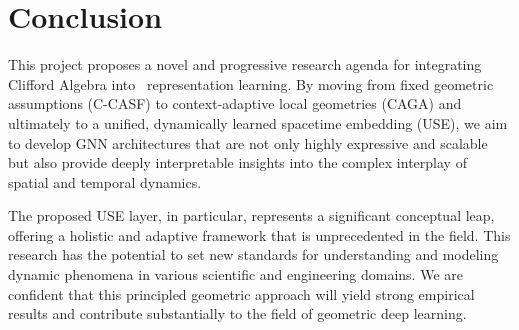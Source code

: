 \documentclass[11pt]{article}
\newcommand{\STG}{\text{CTDSTG}} %
\begin{document}
\section{Conclusion}
This project proposes a novel and progressive research agenda for integrating Clifford Algebra into \STG \ representation learning. By moving from fixed geometric assumptions (C-CASF) to context-adaptive local geometries (CAGA) and ultimately to a unified, dynamically learned spacetime embedding (USE), we aim to develop GNN architectures that are not only highly expressive and scalable but also provide deeply interpretable insights into the complex interplay of spatial and temporal dynamics.

The proposed USE layer, in particular, represents a significant conceptual leap, offering a holistic and adaptive framework that is unprecedented in the field. This research has the potential to set new standards for understanding and modeling dynamic phenomena in various scientific and engineering domains. We are confident that this principled geometric approach will yield strong empirical results and contribute substantially to the field of geometric deep learning.
\end{document}
